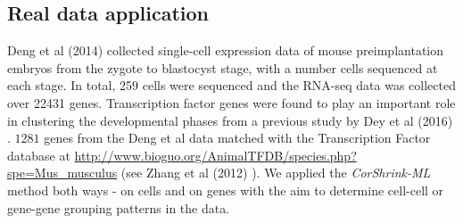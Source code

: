 % 

\subsection{Real data application}
Deng et al (2014) \cite{Deng2014} collected single-cell expression data of mouse preimplantation embryos from the zygote to blastocyst stage, with a number cells sequenced at each stage. In total, 259 cells were sequenced and the RNA-seq data was collected over 22431 genes. Transcription factor genes were found to play an important role in clustering the developmental phases from a previous study by Dey et al (2016) \cite{Dey2016}. $1281$ genes from the Deng et al data matched with the Transcription Factor database at \url{http://www.bioguo.org/AnimalTFDB/species.php?spe=Mus_musculus} (see Zhang et al (2012) \cite{Zhang2012}). We applied the \textit{CorShrink-ML} method both ways - on cells and on genes with the aim to determine cell-cell or gene-gene grouping patterns in the data. 

